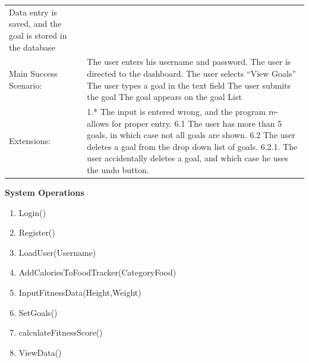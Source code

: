 \documentclass[10pt]{article}
\providecommand{\tightlist}{\setlength{\itemsep}{0pt}\setlength{\parskip}{0pt}}%
\begin{document}
\begin{longtable}[]{@{}ll@{}}
\begin{minipage}[t]{0.47\columnwidth}
Data entry is saved, and the goal is stored in the database\strut
\end{minipage}\tabularnewline
\begin{minipage}[t]{0.48\columnwidth}\raggedright\strut
Main Success Scenario:\strut
\end{minipage} & \begin{minipage}[t]{0.48\columnwidth}\raggedright\strut
The user enters his username and password. The user is directed to the
dashboard. The user selects ``View Goals'' The user types a goal in the
text field The user submits the goal The goal appears on the goal
List\strut
\end{minipage}\tabularnewline
\begin{minipage}[t]{0.48\columnwidth}\raggedright\strut
Extensions:\strut
\end{minipage} & \begin{minipage}[t]{0.48\columnwidth}\raggedright\strut
1.* The input is entered wrong, and the program re-allows for proper
entry. 6.1 The user has more than 5 goals, in which case not all goals
are shown. 6.2 The user deletes a goal from the drop down list of goals.
6.2.1. The user accidentally deletes a goal, and which case he uses the
undo button.\strut
\end{minipage}\tabularnewline
\bottomrule
\end{longtable}


\textbf{System Operations}

\begin{enumerate}
\tightlist
\item
  Login()
\item
  Register()
\item
  LoadUser(Username)
\item
  AddCaloriesToFoodTracker(CategoryFood)
\item
  InputFitnessData(Height,Weight)
\item
  SetGoals()
\item
  calculateFitnessScore()
\item
  ViewData()
\end{enumerate}
\end{document}
